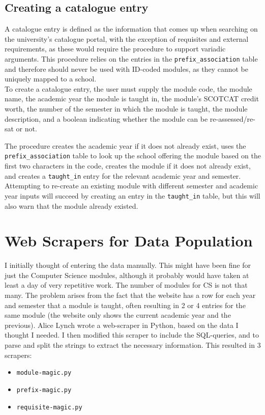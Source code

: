     \subsection{Creating a catalogue entry}
    A catalogue entry is defined as the information that comes up when searching
    on the university's catalogue portal, with the exception of requisites and
    external requirements, as these would require the procedure to support
    variadic arguments. This procedure relies on the entries in the
    \texttt{prefix\_association} table and therefore should never be used with
    ID-coded modules, as they cannot be uniquely mapped to a school.
    \\
        
    To create a catalogue entry, the user must supply the
    module code, the module name, the academic year the module is taught in, the
    module's SCOTCAT credit worth, the number of the semester in which the
    module is taught, the module description, and a boolean indicating whether
    the module can be re-assessed/re-sat or not.
    
    The procedure creates the academic year if it does not already exist, uses
    the \texttt{prefix\_association} table to look up the school offering the
    module based on the first two characters in the code, creates the module if
    it does not already exist, and creates a \texttt{taught\_in} entry for the
    relevant academic year and semester. Attempting to re-create an existing
    module with different semester and academic year inputs will succeed by
    creating an entry in the \texttt{taught\_in} table, but this will also warn
    that the module already existed.

\section{Web Scrapers for Data Population}
I initially thought of entering the data manually. This might have been fine for
just the Computer Science modules, although it probably would have taken at
least a day of very repetitive work. The number of modules for CS is not that
many. The problem arises from the fact that the website has a row for each year
and semester that a module is taught, often resulting in 2 or 4 entries for the
same module (the website only shows the current academic year and the previous).
Alice Lynch wrote a web-scraper in Python, based on the data I thought I needed.
I then modified this scraper to include the SQL-queries, and to parse and split
the strings to extract the necessary information. This resulted in 3 scrapers:
\begin{itemize}
    \item \texttt{module-magic.py}
    \item \texttt{prefix-magic.py}
    \item \texttt{requisite-magic.py}
\end{itemize}

